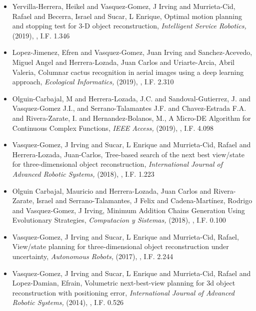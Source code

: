 \begin{itemize}
\item Yervilla-Herrera, Heikel and Vasquez-Gomez, J Irving and Murrieta-Cid, Rafael and Becerra, Israel and Sucar, L Enrique, Optimal motion planning and stopping test for 3-D object reconstruction,\textit{ Intelligent Service Robotics,} (2019), \href{https://doi.org/10.1007/s11370-018-0264-y} {\faExternalLink}, I.F. 1.346 
\item Lopez-Jimenez, Efren and Vasquez-Gomez, Juan Irving and Sanchez-Acevedo, Miguel Angel and Herrera-Lozada, Juan Carlos and Uriarte-Arcia, Abril Valeria, Columnar cactus recognition in aerial images using a deep learning approach,\textit{ Ecological Informatics,} (2019), \href{https://doi.org/10.1016/j.ecoinf.2019.05.005} {\faExternalLink}, I.F. 2.310 
\item Olguin-Carbajal, M and Herrera-Lozada, J.C. and Sandoval-Gutierrez, J. and Vasquez-Gomez J.I., and Serrano-Talamantes J.F. and Chavez-Estrada F.A. and Rivera-Zarate, I. and Hernandez-Bolanos, M., A Micro-DE Algorithm for Continuous Complex Functions,\textit{ IEEE Access,} (2019), \href{https://doi.org/10.1109/ACCESS.2019.2954296} {\faExternalLink}, I.F. 4.098 
\item Vasquez-Gomez, J Irving and Sucar, L Enrique and Murrieta-Cid, Rafael and Herrera-Lozada, Juan-Carlos, Tree-based search of the next best view/state for three-dimensional object reconstruction,\textit{ International Journal of Advanced Robotic Systems,} (2018), \href{https://doi.org/10.1177/1729881418754575} {\faExternalLink}, I.F. 1.223 
\item Olguin Carbajal, Mauricio and Herrera-Lozada, Juan Carlos and Rivera-Zarate, Israel and Serrano-Talamantes, J Felix and Cadena-Martínez, Rodrigo and Vasquez-Gomez, J Irving, Minimum Addition Chains Generation Using Evolutionary Strategies,\textit{ Computacion y Sistemas,} (2018), \href{https://doi.org/10.13053/CyS-22-4-2751} {\faExternalLink}, I.F. 0.100 
\item Vasquez-Gomez, J Irving and Sucar, L Enrique and Murrieta-Cid, Rafael, View/state planning for three-dimensional object reconstruction under uncertainty,\textit{ Autonomous Robots,} (2017), \href{https://doi.org/10.1007/s10514-015-9531-3} {\faExternalLink}, I.F. 2.244 
\item Vasquez-Gomez, J Irving and Sucar, L Enrique and Murrieta-Cid, Rafael and Lopez-Damian, Efrain, Volumetric next-best-view planning for 3d object reconstruction with positioning error,\textit{ International Journal of Advanced Robotic Systems,} (2014), \href{https://doi.org/10.5772/58759} {\faExternalLink}, I.F. 0.526 
\end{itemize} 
